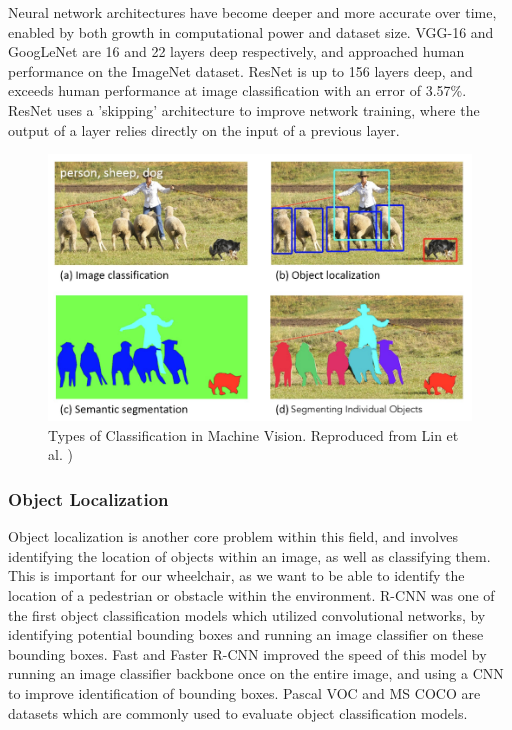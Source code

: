 \documentclass[12pt]{article}
\begin{document}
Neural network architectures have become deeper and more accurate over time, enabled by both
growth in computational power and dataset size. VGG-16 \cite{simonyanVeryDeepConvolutional2014}
and GoogLeNet \cite{szegedyGoingDeeperConvolutions2014}
are 16 and 22 layers deep respectively, and approached
human performance on the ImageNet dataset. ResNet \cite{heDeepResidualLearning2016} is up to 156 layers deep,
and exceeds human performance at image classification with an error of 3.57\%.
ResNet uses a 'skipping' architecture to improve network training, where the output of a layer relies directly on
the input of a previous layer.

\begin{figure}
    \centering
    \includegraphics[width=0.6\linewidth]{images/classification_types.png}
    \caption{Types of Classification in Machine Vision. Reproduced from Lin et al. \cite{linMicrosoftCOCOCommon2014})}
    \label{fig:classification_types}
\end{figure}

\subsubsection{Object Localization}
Object localization is another core problem within this field, and involves identifying the location of objects within an image,
as well as classifying them. This is important for our wheelchair, as we want to be able to identify the location of
a pedestrian or obstacle within the environment. R-CNN \cite{girshickRichFeatureHierarchies2013} was one of the
first object classification models which utilized convolutional networks, by identifying potential bounding boxes
and running an image classifier on these bounding boxes. Fast and Faster R-CNN \cite{girshickFastRCNN2015}\cite{renFasterRCNNRealTime2015}
improved the speed of this model by running an image classifier backbone once on the entire image, and using a CNN to improve
identification of bounding boxes. Pascal VOC \cite{everinghamPascalVisualObject2009} and MS COCO \cite{linMicrosoftCOCOCommon2014}
are datasets which are commonly used to evaluate object classification models.
\end{document}

